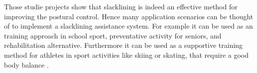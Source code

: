 Those studie projects show that slacklining is indeed an effective method for improving the postural control. Hence many application scenarios can be thought of to implement a slacklining assistance system. For example it can be used as an training approach in school sport, preventative activity for seniors, and rehabilitation alternative. Furthermore it can be used as a supportive training method for athletes in sport activities like skiing or skating, that require a good body balance \cite{Pfusterschmied2013-yy}.
